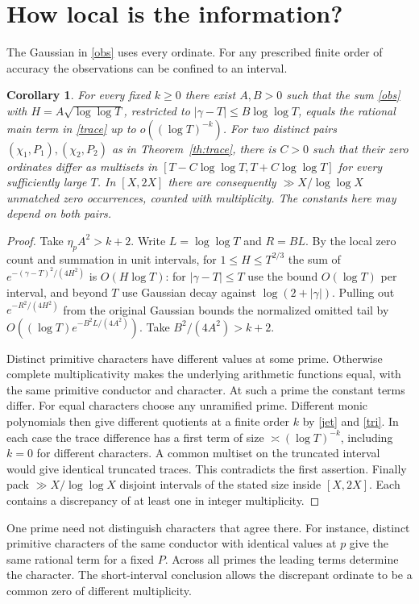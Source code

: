 \documentclass[11pt,letterpaper]{article}
\newtheorem{corollary}[theorem]{Corollary}
\begin{document}
\section{How local is the information?}
The Gaussian in \eqref{obs} uses every ordinate. For any prescribed
finite order of accuracy the observations can be confined to an interval.
\begin{corollary}\label{local}
For every fixed $k\ge0$ there exist $A,B>0$ such that the sum
\eqref{obs} with $H=A\sqrt{\log\log T}$, restricted to
$|\gamma-T|\le B\log\log T$, equals the rational main term in \eqref{trace}
up to $o((\log T)^{-k})$.
For two distinct pairs $(\chi_1,P_1),(\chi_2,P_2)$ as in
Theorem~\ref{th:trace}, there is $C>0$ such that their zero ordinates
differ as multisets in $[T-C\log\log T,T+C\log\log T]$ for every
sufficiently large $T$. In $[X,2X]$ there are consequently
$\gg X/\log\log X$ unmatched zero occurrences, counted with multiplicity.
The constants here may depend on both pairs.
\end{corollary}
\begin{proof}
Take $\eta_p A^2>k+2$. Write $L=\log\log T$ and $R=BL$.
By the local zero count and summation in unit intervals, for $1\le H\le
T^{2/3}$ the sum of $e^{-(\gamma-T)^2/(4H^2)}$ is $O(H\log T)$:
for $|\gamma-T|\le T$ use the bound $O(\log T)$ per interval, and
beyond $T$ use Gaussian decay against $\log(2+|\gamma|)$.
Pulling out $e^{-R^2/(4H^2)}$ from the original Gaussian bounds the
normalized omitted tail by $O((\log T)e^{-B^2 L/(4A^2)})$.
Take $B^2/(4A^2)>k+2$.

Distinct primitive characters have different values at some prime.
Otherwise complete multiplicativity makes the underlying arithmetic
functions equal, with the same primitive conductor and character.
At such a prime the constant terms differ. For equal characters choose
any unramified prime. Different monic polynomials then give different
quotients at a finite order $k$ by \eqref{jet} and \eqref{tri}. In each
case the trace difference has a first term of size
$\asymp(\log T)^{-k}$, including $k=0$ for different characters.
A common multiset on the truncated interval would give identical
truncated traces. This contradicts the first assertion. Finally pack
$\gg X/\log\log X$ disjoint intervals of the stated size inside
$[X,2X]$. Each contains a discrepancy of at least one in integer
multiplicity.
\end{proof}
One prime need not distinguish characters that agree there. For instance,
distinct primitive characters of the same conductor with identical
values at $p$ give the same rational term for a fixed $P$. Across all primes
the leading terms determine the character. The short-interval conclusion
allows the discrepant ordinate to be a common zero of different multiplicity.
\end{document}

